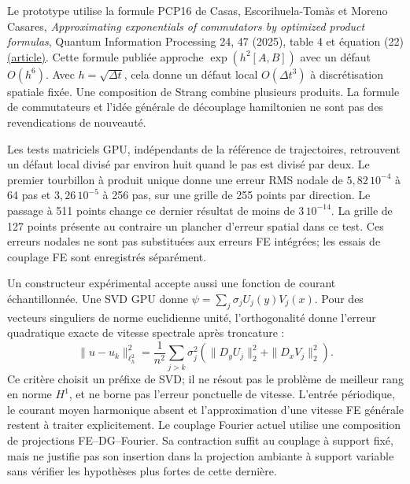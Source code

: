 \documentclass[11pt,a4paper]{article}
\begin{document}
Le prototype utilise la formule PCP16 de Casas, Escorihuela-Tomàs et
Moreno Casares, \emph{Approximating exponentials of commutators by
optimized product formulas}, Quantum Information Processing 24, 47 (2025),
table 4 et équation (22)
\href{https://doi.org/10.1007/s11128-025-04659-z}{(article)}.
Cette formule publiée approche $\exp(h^2[A,B])$ avec un défaut
$O(h^6)$. Avec $h=\sqrt{\Delta t}$, cela donne un défaut local
$O(\Delta t^3)$ à discrétisation spatiale fixée. Une composition de Strang
combine plusieurs produits. La formule de commutateurs et l'idée générale
de découplage hamiltonien ne sont pas des revendications de nouveauté.

Les tests matriciels GPU, indépendants de la référence de trajectoires,
retrouvent un défaut local divisé par environ huit quand le pas est divisé
par deux. Le premier tourbillon à produit unique donne une erreur RMS
nodale de $5{,}82\,10^{-4}$ à 64 pas et $3{,}26\,10^{-5}$ à 256 pas,
sur une grille de 255 points par direction. Le passage à 511 points change
ce dernier résultat de moins de $3\,10^{-14}$. La grille de 127 points
présente au contraire un plancher d'erreur spatial dans ce test.
Ces erreurs nodales ne sont pas substituées aux erreurs FE intégrées;
les essais de couplage FE sont enregistrés séparément.

Un constructeur expérimental accepte aussi une fonction de courant
échantillonnée. Une SVD GPU donne $\psi=\sum_j\sigma_j U_j(y)V_j(x)$.
Pour des vecteurs singuliers de norme euclidienne unité, l'orthogonalité
donne l'erreur quadratique exacte de vitesse spectrale après troncature :
\[
 \|u-u_k\|_{\ell^2_h}^2
 =\frac{1}{n^2}\sum_{j>k}\sigma_j^2
 (\|D_yU_j\|_2^2+\|D_xV_j\|_2^2).
\]
Ce critère choisit un préfixe de SVD; il ne résout pas le problème de
meilleur rang en norme $H^1$, et ne borne pas l'erreur ponctuelle de vitesse.
L'entrée périodique, le courant moyen harmonique absent et l'approximation
d'une vitesse FE générale restent à traiter explicitement.
Le couplage Fourier actuel utilise une composition de projections
FE--DG--Fourier. Sa contraction suffit au couplage à support fixé, mais
ne justifie pas son insertion dans la projection ambiante à support
variable sans vérifier les hypothèses plus fortes de cette dernière.
\end{document}
